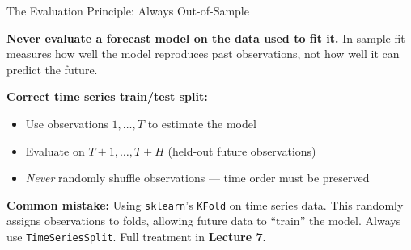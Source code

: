 \documentclass[aspectratio=169, 11pt]{beamer}
\begin{document}
\begin{frame}{The Evaluation Principle: Always Out-of-Sample}
  \begin{keybox}
    \textbf{Never evaluate a forecast model on the data used to fit it.}
    In-sample fit measures how well the model reproduces past observations,
    not how well it can predict the future.
  \end{keybox}
  \vspace{0.3cm}
  \textbf{Correct time series train/test split:}
  \begin{itemize}
    \item Use observations $1, \ldots, T$ to estimate the model
    \item Evaluate on $T+1, \ldots, T+H$ (held-out future observations)
    \item \emph{Never} randomly shuffle observations --- time order must be preserved
  \end{itemize}
  \vspace{0.2cm}
  \begin{warningbox}
    \textbf{Common mistake:} Using \texttt{sklearn}'s \texttt{KFold} on time series data.
    This randomly assigns observations to folds, allowing future data to ``train'' the model.
    Always use \texttt{TimeSeriesSplit}.
    Full treatment in \textbf{Lecture 7}.
  \end{warningbox}
\end{frame}
\end{document}
